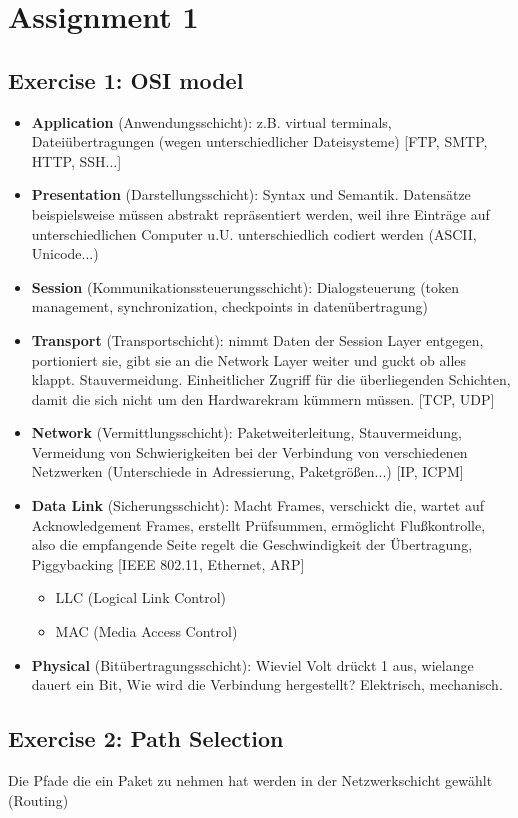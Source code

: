 \documentclass[10pt,a4paper]{scrartcl}
\begin{document}
\section*{Assignment 1}
\subsection*{Exercise 1: OSI model}
\begin{itemize}
\item \textbf{Application} (Anwendungsschicht): z.B. virtual terminals, Dateiübertragungen (wegen unterschiedlicher Dateisysteme) [FTP, SMTP, HTTP, SSH...]
\item \textbf{Presentation} (Darstellungsschicht): Syntax und Semantik. Datensätze beispielsweise müssen abstrakt repräsentiert werden, weil ihre Einträge auf unterschiedlichen Computer u.U. unterschiedlich codiert werden (ASCII, Unicode...) 
\item \textbf{Session} (Kommunikationssteuerungsschicht): Dialogsteuerung (token management, synchronization, checkpoints in datenübertragung) 
\item \textbf{Transport} (Transportschicht): nimmt Daten der Session Layer entgegen, portioniert sie, gibt sie an die Network Layer weiter und guckt ob alles klappt. Stauvermeidung. Einheitlicher Zugriff für die überliegenden Schichten, damit die sich nicht um den Hardwarekram kümmern müssen. [TCP, UDP]
\item \textbf{Network} (Vermittlungsschicht): Paketweiterleitung, Stauvermeidung, Vermeidung von Schwierigkeiten bei der Verbindung von verschiedenen Netzwerken (Unterschiede in Adressierung, Paketgrößen...) [IP, ICPM]
\item \textbf{Data Link} (Sicherungsschicht): Macht Frames, verschickt die, wartet auf Acknowledgement Frames, erstellt Prüfsummen, ermöglicht Flußkontrolle, also die empfangende Seite regelt die Geschwindigkeit der Übertragung, Piggybacking [IEEE 802.11, Ethernet, ARP]
\begin{itemize}
\item LLC (Logical Link Control)
\item MAC (Media Access Control)
\end{itemize}
\item \textbf{Physical} (Bitübertragungsschicht): Wieviel Volt drückt 1 aus, wielange dauert ein Bit, Wie wird die Verbindung hergestellt? Elektrisch, mechanisch.
\end{itemize}


\subsection*{Exercise 2: Path Selection}
Die Pfade die ein Paket zu nehmen hat werden in der Netzwerkschicht gewählt (Routing)
\end{document}
